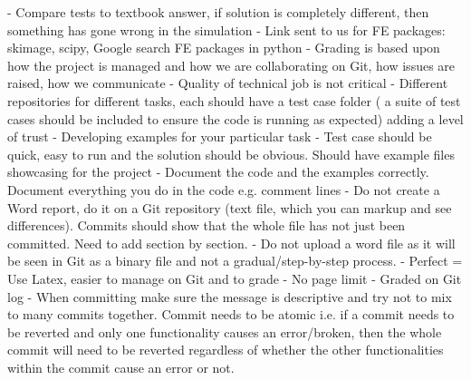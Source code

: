 \documentclass{article}
\begin{document}
- Compare tests to textbook answer, if solution is completely different, then something has gone wrong in the simulation\newline\newline
- Link sent to us for FE packages: skimage, scipy, Google search FE packages in python\newline\newline
- Grading is based upon how the project is managed and how we are collaborating on Git, how issues are raised, how we communicate\newline\newline
- Quality of technical job is not critical\newline\newline
- Different repositories for different tasks, each should have a test case folder ( a suite of test cases should be included to ensure the code is running as expected) adding a level of trust\newline\newline
- Developing examples for your particular task\newline\newline
- Test case should be quick, easy to run and the solution should be obvious. Should have example files showcasing for the project\newline\newline
- Document the code and the examples correctly. Document everything you do in the code e.g. comment lines \newline\newline
- Do not create a Word report, do it on a Git repository (text file, which you can markup and see differences). Commits should show that the whole file has not just been committed. Need to add section by section.\newline\newline
- Do not upload a word file as it will be seen in Git as a binary file and not a gradual/step-by-step process.\newline\newline
- Perfect = Use Latex, easier to manage on Git and to grade\newline\newline
- No page limit\newline\newline
- Graded on Git log\newline\newline
- When committing make sure the message is descriptive and try not to mix to many commits together. Commit needs to be atomic i.e. if a commit needs to be reverted and only one functionality causes an error/broken, then the whole commit will need to be reverted regardless of whether the other functionalities within the commit cause an error or not.\newline\newline
\end{document}
